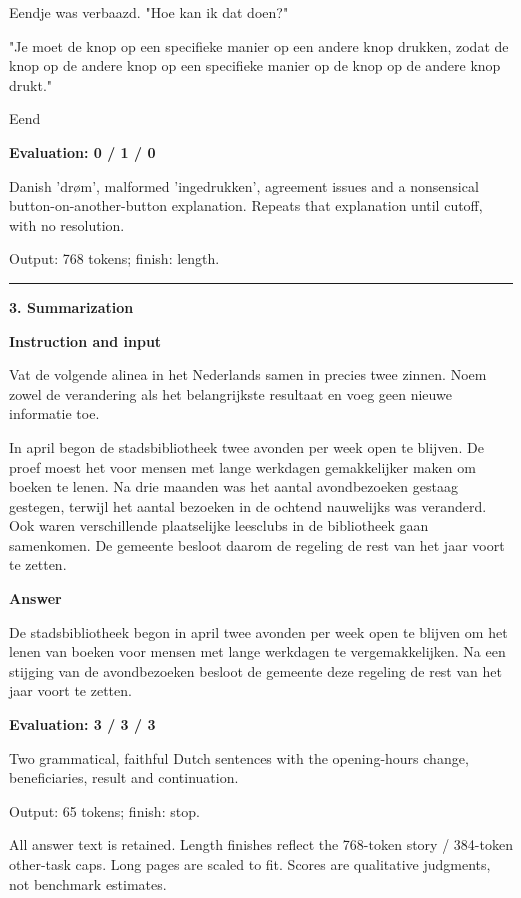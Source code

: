 \documentclass[10pt]{article}
\begin{document}
{\begin{minipage}{\textwidth}
\par\smallskip
Eendje was verbaazd. "Hoe kan ik dat doen?"
\par\smallskip
"Je moet de knop op een specifieke manier op een andere knop drukken, zodat de knop op de andere knop op een specifieke manier op de knop op de andere knop drukt."
\par\smallskip
Eend\par\smallskip
\textbf{Evaluation: 0 / 1 / 0}\par Danish 'drøm', malformed 'ingedrukken', agreement issues and a nonsensical button-on-another-button explanation. Repeats that explanation until cutoff, with no resolution.
\par {\color{gray} Output: 768 tokens; finish: length.}\par
\medskip\hrule\smallskip
{\bfseries 3. Summarization}\par\smallskip
\textbf{Instruction and input}\par Vat de volgende alinea in het Nederlands samen in precies twee zinnen. Noem zowel de verandering als het belangrijkste resultaat en voeg geen nieuwe informatie toe.
\par\smallskip
In april begon de stadsbibliotheek twee avonden per week open te blijven. De proef moest het voor mensen met lange werkdagen gemakkelijker maken om boeken te lenen. Na drie maanden was het aantal avondbezoeken gestaag gestegen, terwijl het aantal bezoeken in de ochtend nauwelijks was veranderd. Ook waren verschillende plaatselijke leesclubs in de bibliotheek gaan samenkomen. De gemeente besloot daarom de regeling de rest van het jaar voort te zetten.\par\smallskip
\textbf{Answer}\par De stadsbibliotheek begon in april twee avonden per week open te blijven om het lenen van boeken voor mensen met lange werkdagen te vergemakkelijken. Na een stijging van de avondbezoeken besloot de gemeente deze regeling de rest van het jaar voort te zetten.\par\smallskip
\textbf{Evaluation: 3 / 3 / 3}\par Two grammatical, faithful Dutch sentences with the opening-hours change, beneficiaries, result and continuation.
\par {\color{gray} Output: 65 tokens; finish: stop.}\par
\medskip\footnotesize All answer text is retained. Length finishes reflect the 768-token story / 384-token other-task caps. Long pages are scaled to fit. Scores are qualitative judgments, not benchmark estimates.
\end{minipage}}%
\end{document}
